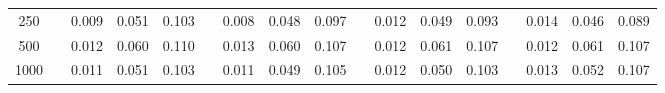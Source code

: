 % 
\begin{tabular}{ccccccccccccccccc}
  \hline
  \hline
250 &  & 0.009 & 0.051 & 0.103 &  & 0.008 & 0.048 & 0.097 &  & 0.012 & 0.049 & 0.093 &  & 0.014 & 0.046 & 0.089 \\ 
  500 &  & 0.012 & 0.060 & 0.110 &  & 0.013 & 0.060 & 0.107 &  & 0.012 & 0.061 & 0.107 &  & 0.012 & 0.061 & 0.107 \\ 
  1000 &  & 0.011 & 0.051 & 0.103 &  & 0.011 & 0.049 & 0.105 &  & 0.012 & 0.050 & 0.103 &  & 0.013 & 0.052 & 0.107 \\ 
   \hline
\end{tabular}
